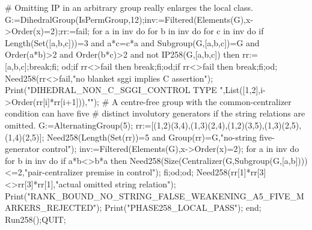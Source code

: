 \documentclass[11pt,a4paper]{article}
\begin{document}
\begin{CompleteProgram}
 # Omitting IP in an arbitrary group really enlarges the local class.
 G:=DihedralGroup(IsPermGroup,12);inv:=Filtered(Elements(G),x->Order(x)=2);rr:=fail;
 for a in inv do for b in inv do for c in inv do
 if Length(Set([a,b,c]))=3 and a*c=c*a and Subgroup(G,[a,b,c])=G
 and Order(a*b)>2 and Order(b*c)>2 and not IP258(G,[a,b,c]) then rr:=[a,b,c];break;fi;
 od;if rr<>fail then break;fi;od;if rr<>fail then break;fi;od;
 Need258(rr<>fail,"no blanket sggi implies C assertion");
 Print("DIHEDRAL_NON_C_SGGI_CONTROL TYPE ",List([1,2],i->Order(rr[i]*rr[i+1])),"\n");
 # A centre-free group with the common-centralizer condition can have five
 # distinct involutory generators if the string relations are omitted.
 G:=AlternatingGroup(5);
 rr:=[(1,2)(3,4),(1,3)(2,4),(1,2)(3,5),(1,3)(2,5),(1,4)(2,5)];
 Need258(Length(Set(rr))=5 and Group(rr)=G,"no-string five-generator control");
 inv:=Filtered(Elements(G),x->Order(x)=2);
 for a in inv do for b in inv do if a*b<>b*a then
 Need258(Size(Centralizer(G,Subgroup(G,[a,b])))<=2,"pair-centralizer premise in control");
 fi;od;od;
 Need258(rr[1]*rr[3]<>rr[3]*rr[1],"actual omitted string relation");
 Print("RANK_BOUND_NO_STRING_FALSE_WEAKENING_A5_FIVE_MARKERS_REJECTED\n");
 Print("PHASE258_LOCAL_PASS\n");
end;
Run258();QUIT;
\end{CompleteProgram}
\end{document}
